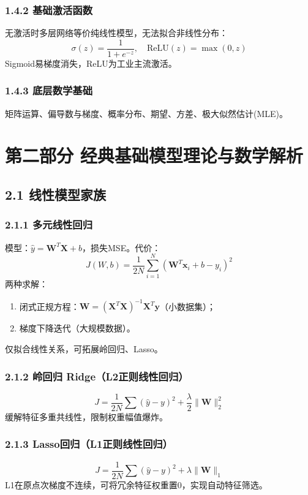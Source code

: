 \documentclass[11pt,a4paper]{article}
\begin{document}
\subsubsection{1.4.2 基础激活函数}
无激活时多层网络等价纯线性模型，无法拟合非线性分布：
\[
\sigma(z)=\frac{1}{1+e^{-z}},\quad \text{ReLU}(z)=\max(0,z)
\]
Sigmoid易梯度消失，ReLU为工业主流激活。

\subsubsection{1.4.3 底层数学基础}
矩阵运算、偏导数与梯度、概率分布、期望、方差、极大似然估计(MLE)。

\section{第二部分 经典基础模型理论与数学解析}
\subsection{2.1 线性模型家族}
\subsubsection{2.1.1 多元线性回归}
模型：$\hat{y}=\boldsymbol{W}^T \boldsymbol{X}+b$，损失MSE。代价：
\[
J(W,b)=\frac{1}{2N}\sum_{i=1}^N (\boldsymbol{W}^T \boldsymbol{x}_i+b-y_i)^2
\]
两种求解：
\begin{enumerate}
\item 闭式正规方程：$\boldsymbol{W}=(\boldsymbol{X}^T\boldsymbol{X})^{-1}\boldsymbol{X}^T \boldsymbol{y}$（小数据集）；
\item 梯度下降迭代（大规模数据）。
\end{enumerate}
仅拟合线性关系，可拓展岭回归、Lasso。

\subsubsection{2.1.2 岭回归 Ridge（L2正则线性回归）}
\[
J=\frac{1}{2N}\sum (\hat{y}-y)^2 + \frac{\lambda}{2}\|\boldsymbol{W}\|_2^2
\]
缓解特征多重共线性，限制权重幅值爆炸。

\subsubsection{2.1.3 Lasso回归（L1正则线性回归）}
\[
J=\frac{1}{2N}\sum (\hat{y}-y)^2 + \lambda\|\boldsymbol{W}\|_1
\]
L1在原点次梯度不连续，可将冗余特征权重置0，实现自动特征筛选。
\end{document}
